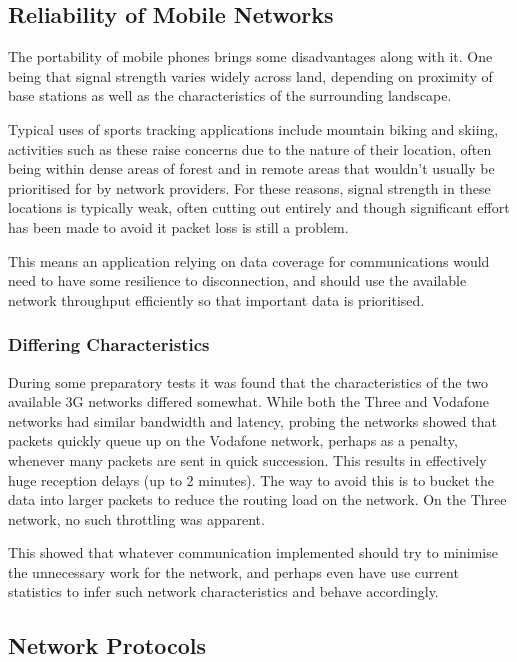 \subsection{Reliability of Mobile Networks}

The portability of mobile phones brings some disadvantages along with it. One being that signal strength varies widely across land, depending on proximity of base stations as well as the characteristics of the surrounding landscape.

Typical uses of sports tracking applications include mountain biking and skiing, activities such as these raise concerns due to the nature of their location, often being within dense areas of forest and in remote areas that wouldn't usually be prioritised for by network providers. For these reasons, signal strength in these locations is typically weak, often cutting out entirely and though significant effort has been made to avoid it packet loss is still a problem.

This means an application relying on data coverage for communications would need to have some resilience to disconnection, and should use the available network throughput efficiently so that important data is prioritised.

\subsubsection*{Differing Characteristics}
\label{3g queue delay}
During some preparatory tests it was found that the characteristics of the two available 3G networks differed somewhat. While both the Three and Vodafone networks had similar bandwidth and latency, probing the networks showed that packets quickly queue up on the Vodafone network, perhaps as a penalty, whenever many packets are sent in quick succession. This results in effectively huge reception delays (up to 2 minutes). The way to avoid this is to bucket the data into larger packets to reduce the routing load on the network. On the Three network, no such throttling was apparent.

This showed that whatever communication implemented should try to minimise the unnecessary work for the network, and perhaps even have use current statistics to infer such network characteristics and behave accordingly.

\subsection{Network Protocols}

